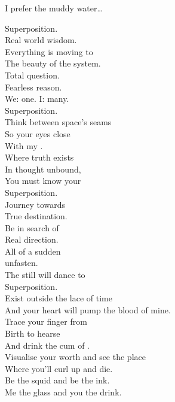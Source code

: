I prefer the muddy water… \\





Superposition. \\
Real world wisdom. \\
Everything is moving to \\
The beauty of the system. \\

Total question. \\
Fearless reason. \\
We: one. I: many. \\
Superposition. \\

Think between space's seams \\
So your eyes close \\
With my . \\
Where truth exists \\
In thought unbound, \\
You must know your \\
Superposition. \\

Journey towards \\
True destination. \\
Be in search of \\
Real direction. \\

All of a sudden \\
 unfasten. \\
The still will dance to \\
Superposition. \\

Exist outside the lace of time \\
And your heart will pump the blood of mine. \\
Trace your finger from \\
Birth to hearse \\
And drink the cum of . \\
Visualise your worth and see the place \\
Where you'll curl up and die. \\
Be the squid and be the ink. \\
Me the glass and you the drink. \\

